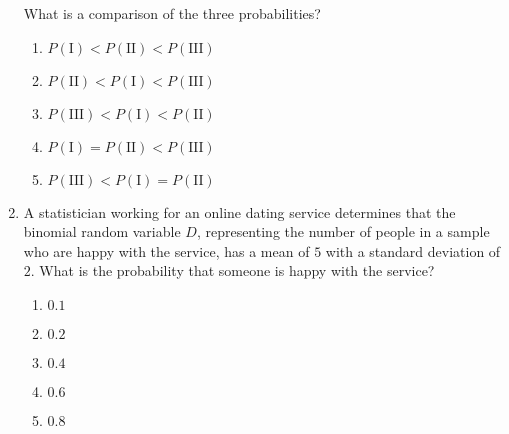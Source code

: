 \documentclass{article}
\begin{document}
\begin{enumerate}[label=\textbf{S\arabic*.}]
What is a comparison of the three probabilities? 

\begin{enumerate}
  \item $P(\mathrm{I}) < P(\mathrm{II}) < P(\mathrm{III})$
  \item $P(\mathrm{II}) < P(\mathrm{I}) < P(\mathrm{III})$
  \item $P(\mathrm{III}) < P(\mathrm{I}) < P(\mathrm{II})$
  \item $P(\mathrm{I}) = P(\mathrm{II}) < P(\mathrm{III})$
  \item $P(\mathrm{III}) < P(\mathrm{I}) = P(\mathrm{II})$
\end{enumerate}

\item A statistician working for an online dating service determines that the binomial random variable $D$, representing the number of people in a sample who are happy with the service, has a mean of $5$ with a standard deviation of $2$. What is the probability that someone is happy with the service? 

\begin{enumerate}
  \item $0.1$
  \item $0.2$
  \item $0.4$
  \item $0.6$
  \item $0.8$
\end{enumerate}


\end{enumerate}
\end{document}
